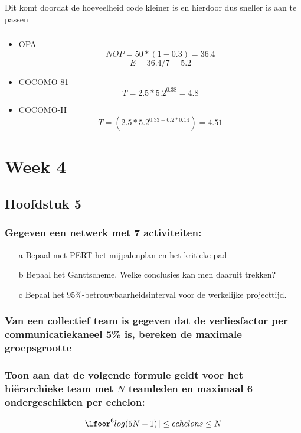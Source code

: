 \documentclass[a4paper,titlepage]{artikel1}
\begin{document}
   \subsubsection[Opdracht 7]{}
   Dit komt doordat de hoeveelheid code kleiner is en hierdoor dus sneller is aan te passen
   
   \subsubsection[Opdracht 8]{}
   \begin{itemize}
    \item OPA
	  \begin{displaymath}
	   NOP=50*(1-0.3)=36.4
	  \end{displaymath} 
	  \begin{displaymath}
	   E=36.4/7=5.2
	  \end{displaymath}
    \item COCOMO-81
	  \begin{displaymath}
	   T=2.5*5.2^{0.38}=4.8
	  \end{displaymath}
    \item COCOMO-II
	  \begin{displaymath}
	   T=(2.5*5.2^{0.33+0.2*0.14})=4.51
	  \end{displaymath}
   \end{itemize}
   \section{Week 4}
   \subsection{Hoofdstuk 5}
   \subsubsection[Opdracht 1]{Gegeven een netwerk met 7 activiteiten:}
   \begin{itemize}
     \item[a] Bepaal met PERT het mijpalenplan en het kritieke pad
     \item[b] Bepaal het Ganttscheme. Welke conclusies kan men daaruit trekken?
     \item[c] Bepaal het 95\%-betrouwbaarheidsinterval voor de werkelijke projecttijd.
   \end{itemize}

   \subsubsection[Opdracht 2]{Van een collectief team is gegeven dat de verliesfactor per communicatiekaneel 5\% is, bereken de maximale groepsgrootte}

   \subsubsection[Opdracht 3]{Toon aan dat de volgende formule geldt voor het hi\"{e}rarchieke team met $N$ teamleden en maximaal 6 ondergeschikten per echelon:}
   \begin{displaymath}
     \lfoor^6log(5N+1)\rfloor\leq echelons\leq N
   \end{displaymath}
   
\end{document}

